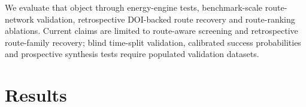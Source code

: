 \documentclass[11pt, letterpaper]{article}
\begin{document}
We evaluate that object through energy-engine tests, benchmark-scale route-network validation, retrospective DOI-backed route recovery and route-ranking ablations. Current claims are limited to route-aware screening and retrospective route-family recovery; blind time-split validation, calibrated success probabilities and prospective synthesis tests require populated validation datasets.

\section*{Results}
\end{document}
